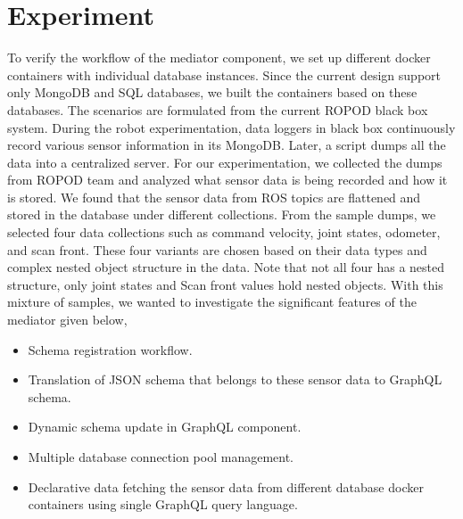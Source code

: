 

	\let\cleardoublepage\clearpage
\chapter{Experiment}\label{sec:experiment}

To verify the workflow of the mediator component, we set up different docker containers with individual database instances. Since the current design support only MongoDB and SQL databases, we built the containers based on these databases. The scenarios are formulated from the current ROPOD black box system. During the robot experimentation, data loggers in black box continuously record various sensor information in its MongoDB. Later, a script dumps all the data into a centralized server.  For our experimentation, we collected the dumps from ROPOD team and analyzed what sensor data is being recorded and how it is stored. We found that the sensor data from ROS topics are flattened and stored in the database under different collections.  
From the sample dumps, we selected four data collections such as command velocity, joint states, odometer, and scan front. These four variants are chosen based on their data types and complex nested object structure in the data. Note that not all four has a nested structure, only joint states and Scan front values hold nested objects. With this mixture of samples, we wanted to investigate the significant features of the mediator given below,
\begin{itemize}
	\item Schema registration workflow.
	\item Translation of JSON schema that belongs to these sensor data to GraphQL schema.
	\item Dynamic schema update in GraphQL component. 
	\item Multiple database connection pool management.
	\item Declarative data fetching the sensor data from different database docker containers using single GraphQL query language.
\end{itemize}



